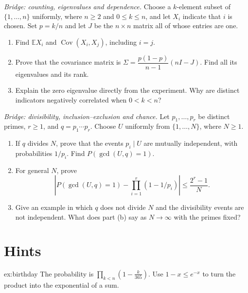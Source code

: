 \begin{exercise}[$\star\star$]\label{ex:covariance-sampling}
\emph{Bridge: counting, eigenvalues and dependence.} Choose a $k$-element subset
of $\{1,\ldots,n\}$ uniformly, where $n\ge2$ and $0\le k\le n$, and let
$X_i$ indicate that $i$ is chosen. Set $p=k/n$ and let $J$ be the $n\times n$
matrix all of whose entries are one.
\begin{enumerate}[label=(\alph*)]
\item Find $\mathbb EX_i$ and $\operatorname{Cov}(X_i,X_j)$, including $i=j$.
\item Prove that the covariance matrix is
$\Sigma=\dfrac{p(1-p)}{n-1}(nI-J)$. Find all its eigenvalues and its rank.
\item Explain the zero eigenvalue directly from the experiment. Why are distinct
indicators negatively correlated when $0<k<n$?
\end{enumerate}
\end{exercise}

\begin{exercise}[$\star\star$]\label{ex:arithmetic-independence}
\emph{Bridge: divisibility, inclusion--exclusion and chance.} Let
$p_1,\ldots,p_r$ be distinct primes, $r\ge1$, and $q=p_1\cdots p_r$.
Choose $U$ uniformly from $\{1,\ldots,N\}$, where $N\ge1$.
\begin{enumerate}[label=(\alph*)]
\item If $q$ divides $N$, prove that the events $p_i\mid U$ are mutually
independent, with probabilities $1/p_i$. Find $P(\gcd(U,q)=1)$.
\item For general $N$, prove
\[
 \left|P(\gcd(U,q)=1)-\prod_{i=1}^r(1-1/p_i)\right|
 \le\frac{2^r-1}{N}.
\]
\item Give an example in which $q$ does not divide $N$ and the divisibility
events are not independent. What does part (b) say as $N\to\infty$ with the
primes fixed?
\end{enumerate}
\end{exercise}

\section{Hints}

\begin{hint}{ex:birthday}
The probability is $\prod_{k<n}\left(1-\frac k{365}\right)$. Use $1-x\le e^{-x}$ to turn the product into the exponential of a sum.
\end{hint}

